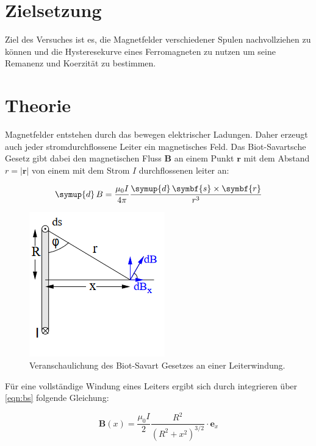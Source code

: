 \section{Zielsetzung}
\label{sec:Zielsetzung}

Ziel des Versuches ist es, die Magnetfelder
verschiedener Spulen nachvollziehen zu können
und die Hysteresekurve eines Ferromagneten zu
nutzen um seine Remanenz und Koerzität zu
bestimmen.

\section{Theorie}
\label{sec:Theorie}

Magnetfelder entstehen durch das bewegen elektrischer Ladungen.
Daher erzeugt auch jeder stromdurchflossene Leiter ein magnetisches
Feld. Das Biot-Savartsche Gesetz gibt dabei den magnetischen Fluss
$\symbf{B}$ an einem Punkt $\symbf{r}$ mit dem Abstand $r=|\symbf{r}|$
von einem mit dem Strom $I$ durchflossenen leiter an:

\begin{equation}
  \symup{d}\,B=\frac{\mu_0I}{4\pi}\frac{\symup{d}\,\symbf{s}\times\symbf{r}}{r^3}
  \label{eqn:bs}
\end{equation}

\begin{figure}
  \centering
  \includegraphics{content/images/biot savart idee.png}
  \caption{Veranschaulichung des Biot-Savart Gesetzes an einer Leiterwindung\cite{anleitung}.}
  \label{fig:bs}
\end{figure}

Für eine vollständige Windung eines Leiters ergibt sich
durch integrieren über \eqref{eqn:bs} folgende Gleichung:

\begin{equation}
  \symbf{B}(x)=\frac{\mu_0I}{2}\frac{R^2}{\left(R^2+x^2\right)^{3/2}}\cdot \symbf{e}_x
  \label{eqn:bswdg}
\end{equation}

